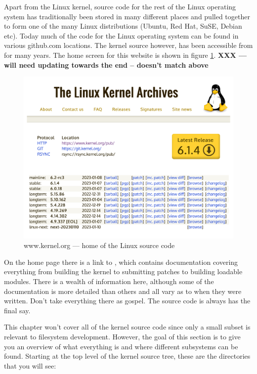  \noindent
Apart from the Linux kernel, source code for the rest of the Linux operating system has traditionally been stored in many different places and pulled together to form one of the many Linux distributions (Ubuntu, Red Hat, SuSE, Debian etc). Today much of the code for the Linux operating system can be found in various github.com locations. The kernel source however, has been accessible from  for many years. The home screen for this website is shown in figure \ref{fig:kernel-org}. \textbf{XXX --- will need updating towards the end -- doesn't match above}

\begin{figure}
	\includegraphics[scale=0.4]{figures/kernel-org.pdf}
	\centering
	\caption{www.kernel.org --- home of the Linux source code}
	\label{fig:kernel-org}
\end{figure}

On the  home page there is a link to , which contains documentation covering everything from building the kernel to submitting patches to building loadable modules. There is a wealth of information here, although some of the documentation is more detailed than others and all vary as to when they were written. Don't take everything there as gospel. The source code is always has the final say.

This chapter won't cover all of the kernel source code since only a small subset is relevant to filesystem development.  However, the goal of this section is to give you an overview of what everything is and where different subsystems can be found. Starting at the top level of the kernel source tree, these are the directories that you will see:

